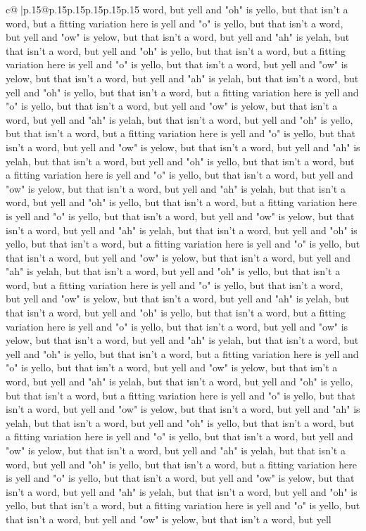 \documentclass{article}
\begin{document}
{\begin{supertabular}{c@{$\;$}|p{.15\linewidth}@{}p{.15\linewidth}p{.15\linewidth}p{.15\linewidth}p{.15\linewidth}p{.15\linewidth}}
{{{word, but yell and "oh" is yello, but that isn't a word, but a fitting variation here is yell and "o" is yello, but that isn't a word, but yell and "ow" is yelow, but that isn't a word, but yell and "ah" is yelah, but that isn't a word, but yell and "oh" is yello, but that isn't a word, but a fitting variation here is yell and "o" is yello, but that isn't a word, but yell and "ow" is yelow, but that isn't a word, but yell and "ah" is yelah, but that isn't a word, but yell and "oh" is yello, but that isn't a word, but a fitting variation here is yell and "o" is yello, but that isn't a word, but yell and "ow" is yelow, but that isn't a word, but yell and "ah" is yelah, but that isn't a word, but yell and "oh" is yello, but that isn't a word, but a fitting variation here is yell and "o" is yello, but that isn't a word, but yell and "ow" is yelow, but that isn't a word, but yell and "ah" is yelah, but that isn't a word, but yell and "oh" is yello, but that isn't a word, but a fitting variation here is yell and "o" is yello, but that isn't a word, but yell and "ow" is yelow, but that isn't a word, but yell and "ah" is yelah, but that isn't a word, but yell and "oh" is yello, but that isn't a word, but a fitting variation here is yell and "o" is yello, but that isn't a word, but yell and "ow" is yelow, but that isn't a word, but yell and "ah" is yelah, but that isn't a word, but yell and "oh" is yello, but that isn't a word, but a fitting variation here is yell and "o" is yello, but that isn't a word, but yell and "ow" is yelow, but that isn't a word, but yell and "ah" is yelah, but that isn't a word, but yell and "oh" is yello, but that isn't a word, but a fitting variation here is yell and "o" is yello, but that isn't a word, but yell and "ow" is yelow, but that isn't a word, but yell and "ah" is yelah, but that isn't a word, but yell and "oh" is yello, but that isn't a word, but a fitting variation here is yell and "o" is yello, but that isn't a word, but yell and "ow" is yelow, but that isn't a word, but yell and "ah" is yelah, but that isn't a word, but yell and "oh" is yello, but that isn't a word, but a fitting variation here is yell and "o" is yello, but that isn't a word, but yell and "ow" is yelow, but that isn't a word, but yell and "ah" is yelah, but that isn't a word, but yell and "oh" is yello, but that isn't a word, but a fitting variation here is yell and "o" is yello, but that isn't a word, but yell and "ow" is yelow, but that isn't a word, but yell and "ah" is yelah, but that isn't a word, but yell and "oh" is yello, but that isn't a word, but a fitting variation here is yell and "o" is yello, but that isn't a word, but yell and "ow" is yelow, but that isn't a word, but yell and "ah" is yelah, but that isn't a word, but yell and "oh" is yello, but that isn't a word, but a fitting variation here is yell and "o" is yello, but that isn't a word, but yell and "ow" is yelow, but that isn't a word, but yell and "ah" is yelah, but that isn't a word, but yell and "oh" is yello, but that isn't a word, but a fitting variation here is yell and "o" is yello, but that isn't a word, but yell and "ow" is yelow, but that isn't a word, but yell }}}
\end{supertabular}}
\end{document}
